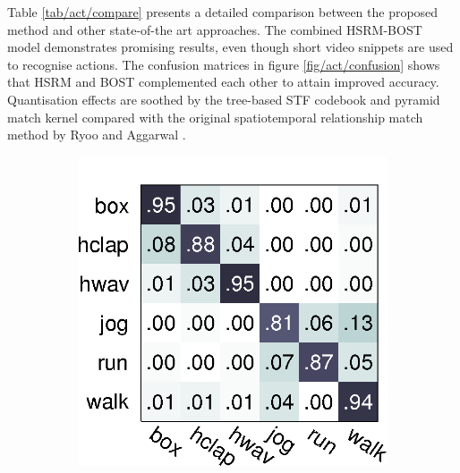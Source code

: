 Table \ref{tab/act/compare} presents a detailed comparison between the proposed method and other state-of-the art approaches. The combined HSRM-BOST model demonstrates promising results, even though short video snippets are used to recognise actions. 
The confusion matrices in figure \ref{fig/act/confusion} shows that HSRM and BOST complemented each other to attain improved accuracy. 
Quantisation effects are soothed by the tree-based STF codebook and pyramid match kernel compared with the original spatiotemporal relationship match method by Ryoo and Aggarwal \cite{Ryoo2009}.

\begin{figure}[ht]
\centering
\begin{subfigure}[t]{0.32\linewidth} \centering 
	\includegraphics[width=1\linewidth]{fig/act/bost.png}
\end{subfigure}
\begin{subfigure}[t]{0.32\linewidth} \centering 

\end{subfigure}
\end{figure}
